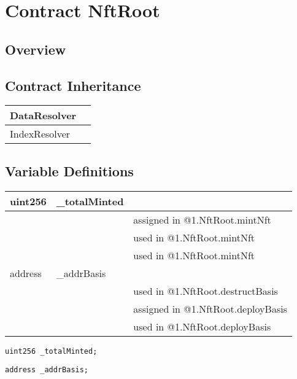 
\chapter{Contract NftRoot}

\minitoc

\section{Overview}



\section{Contract Inheritance}


\noindent\begin{tabular}{|l|p{5cm}|}\hline
DataResolver & \\\hline
IndexResolver & \\\hline
\end{tabular}


\section{Variable Definitions}


\ifsoltables
\noindent\begin{tabular}{|l|l|p{5cm}|}\hline
uint256 & \_{}totalMinted &  \\\hline
 & & assigned in @1.NftRoot.mintNft\\\hline
 & & used in @1.NftRoot.mintNft\\\hline
 & & used in @1.NftRoot.mintNft\\\hline
address & \_{}addrBasis &  \\\hline
 & & used in @1.NftRoot.destructBasis\\\hline
 & & assigned in @1.NftRoot.deployBasis\\\hline
 & & used in @1.NftRoot.deployBasis\\\hline
\end{tabular}
\fi

\begin{lstlisting}[firstnumber=16]
    uint256 _totalMinted;
\end{lstlisting}

\begin{lstlisting}[firstnumber=17]
    address _addrBasis;
\end{lstlisting}


